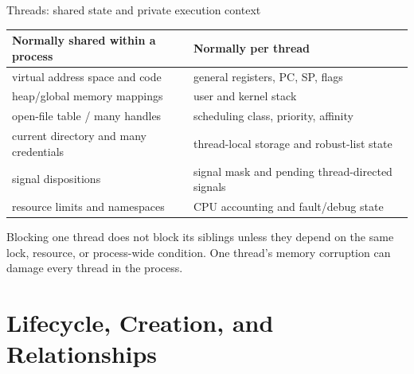 \documentclass[aspectratio=169,11pt]{beamer}
\begin{document}
\begin{frame}{Threads: shared state and private execution context}
  \small
  \begin{tabularx}{\textwidth}{@{}XX@{}}
    \toprule
    \textbf{Normally shared within a process} & \textbf{Normally per thread} \\
    \midrule
    virtual address space and code & general registers, PC, SP, flags \\
    heap/global memory mappings & user and kernel stack \\
    open-file table / many handles & scheduling class, priority, affinity \\
    current directory and many credentials & thread-local storage and robust-list state \\
    signal dispositions & signal mask and pending thread-directed signals \\
    resource limits and namespaces & CPU accounting and fault/debug state \\
    \bottomrule
  \end{tabularx}
  \begin{tcolorbox}[title=Consequence]
    Blocking one thread does not block its siblings unless they depend on the same lock, resource, or process-wide condition. One thread's memory corruption can damage every thread in the process.
  \end{tcolorbox}
\end{frame}

\section{Lifecycle, Creation, and Relationships}
\end{document}

